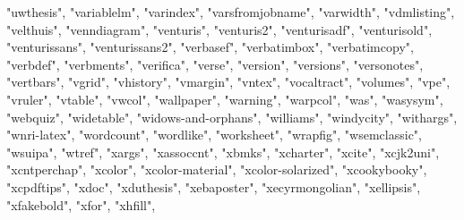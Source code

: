 \documentclass[
]{article}
\newenvironment{Shaded}{\begin{snugshade}}{\end{snugshade}}
\newcommand{\NormalTok}[1]{#1}
\newcommand{\StringTok}[1]{\textcolor[rgb]{0.31,0.60,0.02}{#1}}
\begin{document}
\begin{Shaded}
\begin{Highlighting}[]
\StringTok{"uwthesis"}\NormalTok{, }\StringTok{"variablelm"}\NormalTok{, }\StringTok{"varindex"}\NormalTok{, }\StringTok{"varsfromjobname"}\NormalTok{, }\StringTok{"varwidth"}\NormalTok{, }
\StringTok{"vdmlisting"}\NormalTok{, }\StringTok{"velthuis"}\NormalTok{, }\StringTok{"venndiagram"}\NormalTok{, }\StringTok{"venturis"}\NormalTok{, }\StringTok{"venturis2"}\NormalTok{, }
\StringTok{"venturisadf"}\NormalTok{, }\StringTok{"venturisold"}\NormalTok{, }\StringTok{"venturissans"}\NormalTok{, }\StringTok{"venturissans2"}\NormalTok{, }
\StringTok{"verbasef"}\NormalTok{, }\StringTok{"verbatimbox"}\NormalTok{, }\StringTok{"verbatimcopy"}\NormalTok{, }\StringTok{"verbdef"}\NormalTok{, }\StringTok{"verbments"}\NormalTok{, }
\StringTok{"verifica"}\NormalTok{, }\StringTok{"verse"}\NormalTok{, }\StringTok{"version"}\NormalTok{, }\StringTok{"versions"}\NormalTok{, }\StringTok{"versonotes"}\NormalTok{, }\StringTok{"vertbars"}\NormalTok{, }
\StringTok{"vgrid"}\NormalTok{, }\StringTok{"vhistory"}\NormalTok{, }\StringTok{"vmargin"}\NormalTok{, }\StringTok{"vntex"}\NormalTok{, }\StringTok{"vocaltract"}\NormalTok{, }\StringTok{"volumes"}\NormalTok{, }
\StringTok{"vpe"}\NormalTok{, }\StringTok{"vruler"}\NormalTok{, }\StringTok{"vtable"}\NormalTok{, }\StringTok{"vwcol"}\NormalTok{, }\StringTok{"wallpaper"}\NormalTok{, }\StringTok{"warning"}\NormalTok{, }\StringTok{"warpcol"}\NormalTok{, }
\StringTok{"was"}\NormalTok{, }\StringTok{"wasysym"}\NormalTok{, }\StringTok{"webquiz"}\NormalTok{, }\StringTok{"widetable"}\NormalTok{, }\StringTok{"widows{-}and{-}orphans"}\NormalTok{, }
\StringTok{"williams"}\NormalTok{, }\StringTok{"windycity"}\NormalTok{, }\StringTok{"withargs"}\NormalTok{, }\StringTok{"wnri{-}latex"}\NormalTok{, }\StringTok{"wordcount"}\NormalTok{, }
\StringTok{"wordlike"}\NormalTok{, }\StringTok{"worksheet"}\NormalTok{, }\StringTok{"wrapfig"}\NormalTok{, }\StringTok{"wsemclassic"}\NormalTok{, }\StringTok{"wsuipa"}\NormalTok{, }
\StringTok{"wtref"}\NormalTok{, }\StringTok{"xargs"}\NormalTok{, }\StringTok{"xassoccnt"}\NormalTok{, }\StringTok{"xbmks"}\NormalTok{, }\StringTok{"xcharter"}\NormalTok{, }\StringTok{"xcite"}\NormalTok{, }
\StringTok{"xcjk2uni"}\NormalTok{, }\StringTok{"xcntperchap"}\NormalTok{, }\StringTok{"xcolor"}\NormalTok{, }\StringTok{"xcolor{-}material"}\NormalTok{, }\StringTok{"xcolor{-}solarized"}\NormalTok{, }
\StringTok{"xcookybooky"}\NormalTok{, }\StringTok{"xcpdftips"}\NormalTok{, }\StringTok{"xdoc"}\NormalTok{, }\StringTok{"xduthesis"}\NormalTok{, }\StringTok{"xebaposter"}\NormalTok{, }
\StringTok{"xecyrmongolian"}\NormalTok{, }\StringTok{"xellipsis"}\NormalTok{, }\StringTok{"xfakebold"}\NormalTok{, }\StringTok{"xfor"}\NormalTok{, }\StringTok{"xhfill"}\NormalTok{, }

\end{Highlighting}
\end{Shaded}
\end{document}
